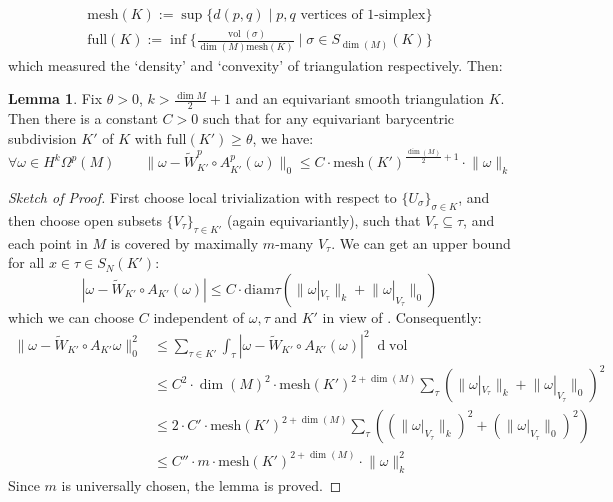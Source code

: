 \documentclass[11pt]{report}
\theoremstyle{definition}
\newtheorem{Lemma}[Def]{Lemma}
\theoremstyle{plain}
\DeclareMathOperator{\vol}{vol}
\newcommand{\norm}[1]{\lVert #1 \rVert}
\renewcommand{\tilde}{\widetilde}
\newcommand{\mass}[1]{\mathop{}\mathrm{d}{#1}}
\begin{document}
\begin{align*}
\mathrm{mesh}(K):=\sup\{d(p,q)\mid \text{$p,q$ vertices of 1-simplex}\}\\
\mathrm{full}(K):=\inf\{\frac{\vol(\sigma)}{\dim(M)\mathrm{mesh}(K)}\mid \sigma\in S_{\dim(M)}(K)\}
\end{align*}
which measured the `density' and `convexity' of triangulation respectively. Then:
\begin{Lemma}\label{2.76}
	Fix $\theta>0$, $k>\frac{\dim M}{2}+1$ and an equivariant smooth triangulation $K$. Then there is a constant $C>0$ such that for any equivariant barycentric subdivision $K'$ of $K$ with $\mathrm{full}(K')\geq \theta$, we have:
	\begin{equation}
	\forall \omega\in H^k\Omega^p(M) \qquad \norm{\omega-\tilde{W}^p_{K'}\circ A^p_{K'}(\omega)}_0\leq C\cdot \mathrm{mesh}(K')^{\frac{\dim(M)}{2}+1}\cdot \norm{\omega}_k
	\end{equation}
\end{Lemma}
\begin{proof}[Sketch of Proof]
First choose local trivialization with respect to $\{U_\sigma\}_{\sigma\in K}$, and then choose open subsets $\{V_\tau\}_{\tau\in K'}$ (again equivariantly), such that $V_\tau\subseteq \tau$, and each point in $M$ is covered by maximally $m$-many $V_\tau$. We can get an upper bound for all $x\in \tau\in S_N(K')$:
\begin{equation}
|\omega-\tilde{W}_{K'}\circ A_{K'}(\omega)|\leq C\cdot \mathrm{diam}\tau (\norm{\omega|_{V_\tau}}_k+\norm{\omega|_{V_\tau}}_0)
\end{equation}
which we can choose $C$ independent of $\omega, \tau$ and $K'$ in view of \cite[Proposition~2.4]{dodziuk1976}. Consequently:
\begin{equation*}
\begin{split}
\norm{\omega-\tilde{W}_{K'}\circ A_{K'}\omega}_0^2&\leq \sum_{\tau\in K'}^{}\int_\tau|\omega-\tilde{W}_{K'}\circ A_{K'}(\omega)|^2\mass{\vol}\\
&\leq C^2\cdot \dim(M)^2\cdot\mathrm{mesh}(K')^{2+\dim(M)}\sum_{\tau}^{}(\norm{\omega|_{V_\tau}}_k+\norm{\omega|_{V_\tau}}_0)^2\\
&\leq 2\cdot C'\cdot \mathrm{mesh}(K')^{2+\dim(M)}\sum_{\tau}^{}((\norm{\omega|_{V_\tau}}_k)^2+(\norm{\omega|_{V_\tau}}_0)^2)\\
&\leq C''\cdot m\cdot \mathrm{mesh}(K')^{2+\dim(M)}\cdot \norm{\omega}_k^2
\end{split}
\end{equation*}
Since $m$ is universally chosen, the lemma is proved.
\end{proof}
\end{document}
